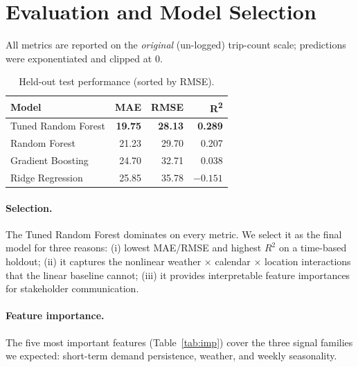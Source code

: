 \documentclass[11pt]{article}
\begin{document}
\section{Evaluation and Model Selection}

All metrics are reported on the \emph{original} (un-logged) trip-count scale;
predictions were exponentiated and clipped at 0.

\begin{table}[H]
\centering
\caption{Held-out test performance (sorted by RMSE).}
\label{tab:results}
\begin{tabular}{lrrr}
\toprule
\textbf{Model} & \textbf{MAE} & \textbf{RMSE} & \textbf{R\textsuperscript{2}} \\
\midrule
Tuned Random Forest & \textbf{19.75} & \textbf{28.13} & \textbf{0.289} \\
Random Forest       & 21.23          & 29.70          & 0.207 \\
Gradient Boosting   & 24.70          & 32.71          & 0.038 \\
Ridge Regression    & 25.85          & 35.78          & $-0.151$ \\
\bottomrule
\end{tabular}
\end{table}

\paragraph{Selection.}
The Tuned Random Forest dominates on every metric. We select it as the final
model for three reasons:
(i) lowest MAE/RMSE and highest $R^2$ on a time-based holdout;
(ii) it captures the nonlinear weather $\times$ calendar $\times$ location
interactions that the linear baseline cannot;
(iii) it provides interpretable feature importances for stakeholder
communication.

\paragraph{Feature importance.}
The five most important features (Table~\ref{tab:imp}) cover the three signal
families we expected: short-term demand persistence, weather, and weekly
seasonality.
\end{document}
